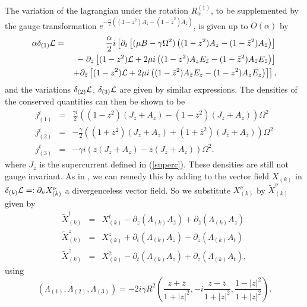 \documentclass[a4paper,11pt]{article}
\begin{document}
The variation of the lagrangian under the rotation $R^{(1)}_{\alpha}$, to be
supplemented by the gauge transformation $e^{-\frac{\alpha}{2}\left(
(1-z^{2})A_{z}-(1-\bar{z}^{2})A_{\bar{z}}\right)}$, is given up to 
$O(\alpha)$ by
\begin{eqnarray*}
\alpha \delta_{(1)} {\cal L}&=&
\frac{\alpha}{2}
i\left[
\partial_{t} \left[ (\mu B -\gamma \Omega^{2}) 
\left( (1-z^{2}) A_{z}- (1-\bar{z}^{2}) A_{\bar{z}} \right) \right] \right.\\
&&-\left.\partial_{z}\left[(1-z^{2}){\cal L}+2\mu i \left(
(1-z^{2})A_{z}E_{\bar{z}}-(1-\bar{z}^{2})A_{\bar{z}}E_{\bar{z}}\right)
\right] \right. \\
&&\left. +\partial_{\bar{z}}\left[(1-z^{2}){\cal L}+2\mu i\left(
(1-\bar{z}^{2})A_{\bar{z}}E_{z}-(1-z^{2})A_{z}E_{z}\right)
\right] \right],
\end{eqnarray*}
and the variations $\delta_{(2)}{\cal L}$, $\delta_{(3)}{\cal L}$ are
given by similar expressions. The densities of the conserved
quantities can then be shown to be
\begin{eqnarray*}
j^{t}_{(1)}&=&\frac{\gamma i}{2}\left( 
(1-z^{2})(J_{z}+A_{z})-
(1-\bar{z}^{2})(J_{\bar{z}}+A_{\bar{z}})\right) \Omega^{2}\\
j^{t}_{(2)}&=&-\frac{\gamma}{2}\left( 
(1+z^{2})(J_{z}+A_{z})+
(1+\bar{z}^{2})(J_{\bar{z}}+A_{\bar{z}})\right) \Omega^{2}\\
j^{t}_{(3)}&=&-\gamma i\left( z(J_{z}+A_{z})-
\bar{z}(J_{\bar{z}}+A_{\bar{z}})\right) \Omega^{2}.
\end{eqnarray*}
where $J_{z}$ is the supercurrent defined in (\ref{superc}).
These densities are still not gauge invariant. As in \cite{MNcl}, we can
remedy this by adding to the vector field $X_{(k)}$ in 
$\delta_{(k)}{\cal  L}=:\partial_{\nu}X^{\nu}_{(k)}$ a divergenceless
vector field. So we substitute $X^{\nu}_{(k)}$ by 
$\tilde{X}^{\nu}_{(k)}$ given by
\begin{eqnarray*}
\tilde{X}_{(k)}^{t}&=&X_{(k)}^{t}
-\partial_{z}(\Lambda_{(k)}A_{\bar{z}})
+\partial_{\bar{z}}(\Lambda_{(k)}A_{z})\\
\tilde{X}_{(k)}^{z}&=&X_{(k)}^{z}
+\partial_{t}(\Lambda_{(k)}A_{\bar{z}})
-\partial_{\bar{z}}(\Lambda_{(k)}A_{t})\\
\tilde{X}_{(k)}^{\bar{z}}&=&X_{(k)}^{\bar{z}}
-\partial_{t}(\Lambda_{(k)}A_{z})
+\partial_{z}(\Lambda_{(k)}A_{t}),
\end{eqnarray*}
using
\[
\left(\Lambda_{(1)},\Lambda_{(2)},\Lambda_{(3)}\right)=
-2i\gamma R^{2} \left(   
\frac{z+\bar{z}}{1+|z|^{2}},
-i\frac{z-\bar{z}}{1+|z|^{2}},
\frac{1-|z|^{2}}{1+|z|^{2}}
\right).
\]
\end{document}

